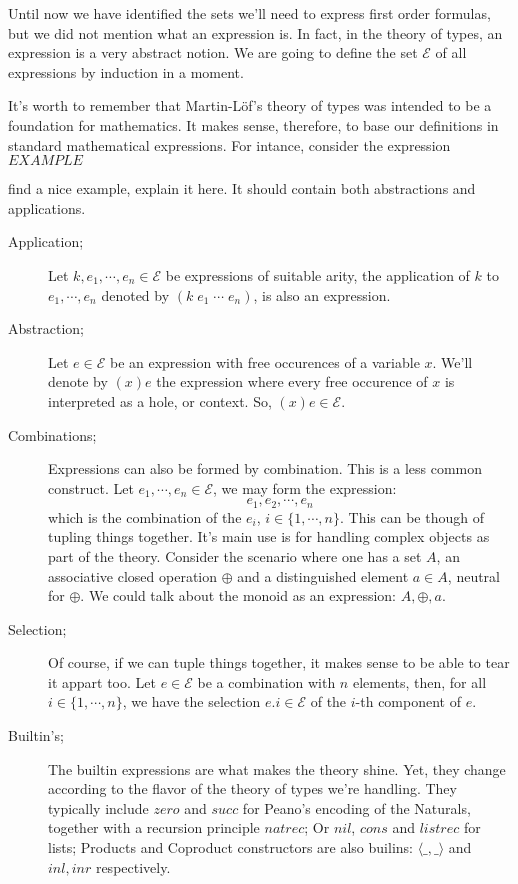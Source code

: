 Until now we have identified the sets we'll need to express first order formulas, but we
did not mention what an expression is. In fact, in the theory of types, an expression is a
very abstract notion. We are going to define the set $\mathcal{E}$ of all expressions by induction
in a moment. 

It's worth to remember that Martin-L\"{o}f's theory of types was intended to be a foundation
for mathematics. It makes sense, therefore, to base our definitions in standard mathematical expressions.
For intance, consider the expression $EXAMPLE$
\begin{TODO}
  \item find a nice example, explain it here. It should contain both abstractions and applications.
\end{TODO}

\begin{mydef}[Expressions]\hfill
\begin{description}
  \item[Application;]
    Let $k, e_1, \cdots, e_n \in \mathcal{E}$ be expressions of suitable arity, 
    the application of $k$ to $e_1, \cdots, e_n$ denoted by $(k\;e_1\;\cdots\;e_n)$,
    is also an expression.
  
  \item[Abstraction;]
    Let $e \in \mathcal{E}$ be an expression with free occurences of a variable $x$.
    We'll denote by $(x)e$ the expression where every free occurence of $x$ is
    interpreted as a hole, or context. So, $(x)e \in \mathcal{E}$.
  
  \item[Combinations;]
    Expressions can also be formed by combination. This is a less common construct.
    Let $e_1, \cdots, e_n \in \mathcal{E}$, we may form the expression:
    \[
      e_1,e_2,\cdots,e_n
    \]
    which is the combination of the $e_i$, $i \in \{1,\cdots,n\}$. 
    This can be though of tupling things together. It's main use is for
    handling complex objects as part of the theory. Consider the
    scenario where one has a set $A$, an associative closed operation $\oplus$ and
    a distinguished element $a \in A$, neutral for $\oplus$. We could talk
    about the monoid as an expression: $A, \oplus, a$.
  
  \item[Selection;]
    Of course, if we can tuple things together, it makes sense to be able to
    tear it appart too. Let $e\in\mathcal{E}$ be a combination with
    $n$ elements, then, for all $i \in \{1, \cdots, n\}$, we have the
    selection $e.i \in \mathcal{E}$ of the $i$-th component of $e$.
  
  \item[Builtin's;]
    The builtin expressions are what makes the theory shine. Yet, 
    they change according to the flavor of the theory of types we're handling.
    They typically include $zero$ and $succ$ for Peano's encoding of the Naturals, 
    together with a recursion principle $natrec$; Or $nil$, $cons$ and $listrec$
    for lists; Products and Coproduct constructors are also builins: $\langle\_,\_\rangle$
    and $inl, inr$ respectively.
\end{description}
\end{mydef}\hfill

